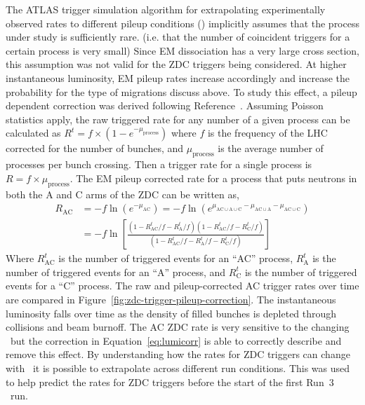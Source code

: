 The ATLAS trigger simulation algorithm for extrapolating experimentally observed rates to different pileup conditions (\avmu) implicitly assumes that the process under study is sufficiently rare. (i.e. that the number of coincident triggers for a certain process is very small)
Since EM dissociation has a very large cross section, this assumption was not valid for the ZDC triggers being considered.
At higher instantaneous luminosity, EM pileup rates increase accordingly and increase the probability for the type of migrations discuss above.
To study this effect, a pileup dependent correction was derived following Reference~\cite{EM:pileupcorr}.
Assuming Poisson statistics apply, the raw triggered rate for any number of a  given process can be calculated as $R^{t} = f  \times \left(1- e^{-\mu_{\mathrm{process}}}\right)$ where $f$ is the frequency of the LHC corrected for the number of bunches,  and $\mu_{\mathrm{process}}$ is the average number of processes per bunch crossing.
Then a trigger rate for a single process is $R = f \times \mu_{\mathrm{process}} $.
The EM pileup corrected rate for a process that puts neutrons in both the A and C arms of the ZDC can be written as,
\begin{equation}
    \label{eq:lumicorr}
    \begin{aligned}
        R_{\mathrm{AC}} &= -f \ln \left(e^{-\mu_{\mathrm{A C}}}\right)
        = -f \ln \left(e^{\mu_{\mathrm{AC \cup A \cup C}} - \mu_{\mathrm{AC \cup A}} - \mu_{\mathrm{AC \cup C}}}\right) \\
        &= -f \ln \left[\frac{\left(1-R^{t}_{\mathrm{AC}}/f - R^{t}_{\mathrm{A}}/f\right)\left(1-R^{t}_{\mathrm{AC}}/f - R^{t}_{\mathrm{C}}/f\right)}{\left(1-R^{t}_{\mathrm{AC}}/f - R^{t}_{\mathrm{A}}/f - R^{t}_{\mathrm{C}}/f\right)}\right]
    \end{aligned}
\end{equation}
Where $R^{t}_{\mathrm{AC}}$ is the number of triggered events for an ``AC'' process, $R^{t}_{\mathrm{A}}$ is the number of triggered events for an ``A'' process, and  $R^{t}_{\mathrm{C}}$ is the number of triggered events for a ``C'' process.
The raw and pileup-corrected AC trigger rates over time are compared in Figure~\ref{fig:zdc-trigger-pileup-correction}.
The instantaneous luminosity falls over time as the density of filled bunches is depleted through collisions and beam burnoff.
The AC ZDC rate is very sensitive to the changing \avmu\ but the correction in Equation~\ref{eq:lumicorr} is able to correctly describe and remove this effect.
By understanding how the rates for ZDC triggers can change with \avmu\ it is possible to extrapolate across different run conditions.
This was used to help predict the rates for ZDC triggers before the start of the first Run~3 \PbxPb\ run.

